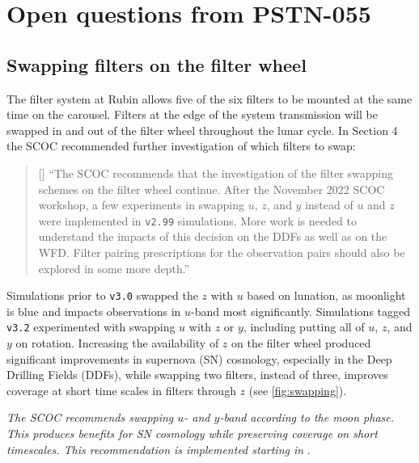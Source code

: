
\section{Open questions from PSTN-055} \label{sec:openquestions}

\subsection{Swapping filters on the filter wheel}\label{sec:filterswap}
The filter system at Rubin allows five of the six filters to be mounted at the same time on the carousel. Filters at the edge of the system transmission will be swapped in and out of the filter wheel throughout the lunar cycle. In  Section 4 the SCOC recommended further investigation of which filters to swap: 
\begin{quote}{[] ``The SCOC recommends that the investigation of the filter swapping schemes on the filter wheel continue. After the November 2022 SCOC workshop, a few experiments in swapping $u$, $z$, and $y$ instead of $u$ and $z$ were implemented in \texttt{v2.99} simulations. More work is needed to understand the impacts of this decision on the DDFs as well as on the WFD. Filter pairing prescriptions for the observation pairs should also be explored in some more depth.''}
\end{quote}

 Simulations prior to \texttt{v3.0} swapped the $z$ with $u$ based on lunation, as moonlight is blue and impacts observations in $u$-band most significantly. Simulations tagged \texttt{v3.2}  experimented with  swapping $u$ with $z$ or $y$, including putting all of $u$, $z$, and $y$ on rotation. Increasing the availability of $z$ on the filter wheel produced significant improvements in supernova (SN) cosmology, especially in the Deep Drilling Fields (DDFs), while swapping two filters, instead of three, improves coverage at short time scales in filters through $z$ (see \autoref{fig:swapping}). 
 
{\it The SCOC recommends swapping $u$- and $y$-band according to the moon phase. This produces benefits for SN cosmology while preserving coverage on short timescales. This recommendation is implemented starting in }.

